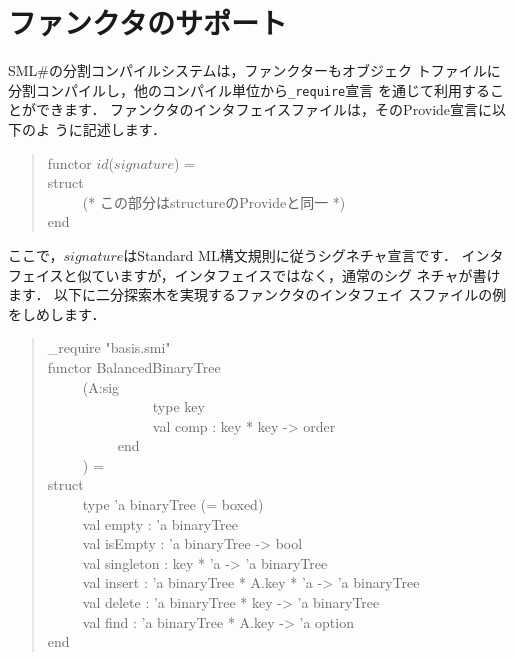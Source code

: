 \documentclass{jbook}
\newcommand{\smlsharp}{SML\#}
\newenvironment{program}{\begin{tt}\begin{quote}}{\end{quote}\end{tt}}
\newcommand{\myem}{\ \ \ \ \  }
\begin{document}
\section{ファンクタのサポート}
\label{sec:tutorialFunctorInInterface}


	\smlsharp{}の分割コンパイルシステムは，ファンクターもオブジェク
トファイルに分割コンパイルし，他のコンパイル単位から{\tt \_require}宣言
を通じて利用することができます．
	ファンクタのインタフェイスファイルは，そのProvide宣言に以下のよ
うに記述します．
\begin{program}
functor $id$($signature$) =\\
struct\\
\myem (* この部分はstructureのProvideと同一 *)\\
end
\end{program}
	ここで，$signature$はStandard ML構文規則に従うシグネチャ宣言です．
	インタフェイスと似ていますが，インタフェイスではなく，通常のシグ
ネチャが書けます．
	以下に二分探索木を実現するファンクタのインタフェイ
スファイルの例をしめします．
\begin{program}
\_require "basis.smi"\\
functor BalancedBinaryTree\\
\myem  (A:sig\\
\myem\myem\myem      type key\\
\myem\myem\myem      val comp : key * key -> order\\
\myem\myem    end\\
\myem  ) =\\
struct\\
\myem type 'a binaryTree (= boxed)\\
\myem  val empty : 'a binaryTree\\
\myem  val isEmpty : 'a binaryTree -> bool\\
\myem  val singleton : key * 'a -> 'a binaryTree\\
\myem  val insert : 'a binaryTree * A.key * 'a -> 'a binaryTree\\
\myem  val delete : 'a binaryTree * key -> 'a binaryTree\\
\myem  val find : 'a binaryTree * A.key -> 'a option\\
end
\end{program}
\end{document}

